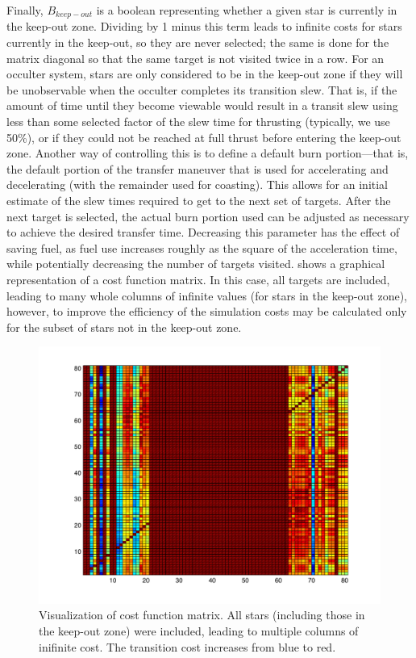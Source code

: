 Finally, $B_{keep-out}$ is a boolean representing whether a given star is currently in the keep-out zone.  Dividing by 1 minus this term leads to infinite costs for stars currently in the keep-out, so they are never selected; the same is done for the matrix diagonal so that the same target is not visited twice in a row.  For an occulter system, stars are only considered to be in the keep-out zone if they will be unobservable when the occulter completes its transition slew.  That is, if the amount of time until they become viewable would result in a transit slew using less than some selected factor of the slew time for thrusting (typically, we use 50\%), or if they could not be reached at full thrust before entering the keep-out zone.  Another way of controlling this is to define a default burn portion---that is, the default portion of the transfer maneuver that is used for accelerating and decelerating (with the remainder used for coasting).  This allows for an initial estimate of the slew times required to get to the next set of targets.  After the next target is selected, the actual burn portion used can be adjusted as necessary to achieve the desired transfer time.  Decreasing this parameter has the effect of saving fuel, as fuel use increases roughly as the square of the acceleration time, while potentially decreasing the number of targets visited.  shows a graphical representation of a cost function matrix.  In this case, all targets are included, leading to many whole columns of infinite values (for stars in the keep-out zone), however, to improve the efficiency of the simulation costs may be calculated only for the subset of stars not in the keep-out zone.
\begin{figure}[ht]
\centering
   \includegraphics[width = 5.5in,clip=true,trim=0.5in 0.3in 0.5in 0.3in]{./figures/adjmatfig}
 \caption[Cost Function Matrix]{ \label{fig:adjmat} Visualization of cost function matrix.  All stars (including those in the keep-out zone) were included, leading to multiple columns of inifinite cost. The transition cost increases from blue to red.}
 \end{figure}

